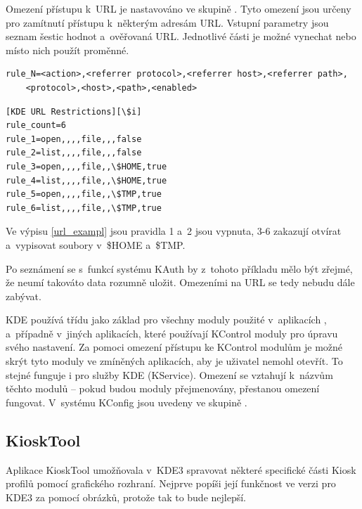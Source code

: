Omezení přístupu k~URL je nastavováno ve skupině . Tyto omezení jsou určeny pro zamítnutí přístupu k~některým adresám URL. Vstupní parametry jsou seznam šestic hodnot a~ověřovaná URL. Jednotlivé části je možné vynechat nebo místo nich použít proměnné.
\begin{mylisting}
\caption{Syntaxe pro zápis omezení URL}
\label{url_syntax}
\begin{lstlisting}
rule_N=<action>,<referrer protocol>,<referrer host>,<referrer path>,
    <protocol>,<host>,<path>,<enabled>
\end{lstlisting}
\end{mylisting}

\begin{mylisting}
\caption{Ukázka zápisu omezení URL}
\label{url_exampl}
\begin{lstlisting}
[KDE URL Restrictions][\$i]
rule_count=6
rule_1=open,,,,file,,,false
rule_2=list,,,,file,,,false
rule_3=open,,,,file,,\$HOME,true
rule_4=list,,,,file,,\$HOME,true
rule_5=open,,,,file,,\$TMP,true
rule_6=list,,,,file,,\$TMP,true
\end{lstlisting}
\end{mylisting}
Ve výpisu \ref{url_exampl} jsou pravidla 1 a~2 jsou vypnuta, 3-6 zakazují otvírat a~vypisovat soubory
v~\$HOME a~\$TMP.

Po seznámení se s~funkcí systému KAuth by z~tohoto příkladu mělo být zřejmé, že neumí takováto data rozumně uložit. Omezeními na URL se tedy nebudu dále zabývat.

KDE používá třídu  jako základ pro všechny moduly použité v~aplikacích ,  a~případně v~jiných aplikacích, které používají KControl moduly pro úpravu svého nastavení. Za pomoci omezení přístupu ke KControl modulům je možné skrýt tyto moduly ve zmíněných aplikacích, aby je uživatel nemohl otevřít. To stejné funguje i pro služby KDE (KService). Omezení se vztahují k~názvům těchto modulů -- pokud budou moduly přejmenovány, přestanou omezení fungovat. V~systému KConfig jsou uvedeny ve skupině .

\subsection*{KioskTool}
Aplikace KioskTool umožňovala v~KDE3 spravovat některé specifické části Kiosk profilů pomocí grafického rozhraní. Nejprve popíši její funkčnost ve verzi pro KDE3 za pomocí obrázků, protože tak to bude nejlepší.

